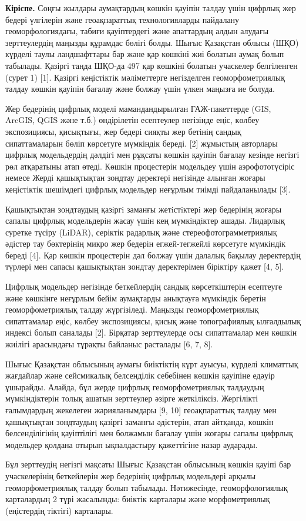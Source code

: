 \begin{multicols}{2}
{\bfseries Кіріспе.} Соңғы жылдары аумақтардың көшкін қауіпін талдау үшін
цифрлық жер бедері үлгілерін және геоақпараттық технологияларды
пайдалану геоморфологиядағы, табиғи қауіптердегі және апаттардың алдын
алудағы зерттеулердің маңызды құрамдас бөлігі болды. Шығыс Қазақстан
облысы (ШҚО) күрделі таулы ландшафттары бар және қар көшкіні жиі болатын
аумақ болып табылады. Қазіргі таңда ШҚО-да 497 қар көшкіні болатын
учаскелер белгіленген (сурет 1) {[}1{]}. Қазіргі кеңістіктік
мәліметтерге негізделген геоморфометриялық талдау көшкін қауіпін бағалау
және болжау үшін үлкен маңызға ие болуда.

Жер бедерінің цифрлық моделі мамандандырылған ГАЖ-пакеттерде (GIS,
ArcGIS, QGIS және т.б.) өндірілетін есептеулер негізінде еңіс, көлбеу
экспозициясы, қисықтығы, жер бедері сияқты жер бетінің сандық
сипаттамаларын бөліп көрсетуге мүмкіндік береді. {[}2{]} жұмыстың
авторлары цифрлық модельдердің дәлдігі мен рұқсаты көшкін қауіпін
бағалау кезінде негізгі рөл атқаратыны атап өтеді. Көшкін процестерін
модельдеу үшін аэрофототүсіріс немесе Жерді қашықтықтан зондтау
деректері негізінде алынған жоғары кеңістіктік шешімдегі цифрлық
модельдер неғұрлым тиімді пайдаланылады {[}3{]}.

Қашықтықтан зондтаудың қазiргi заманғы жетiстiктерi жер бедерінің жоғары
сапалы цифрлық модельдерiн жасау үшiн кең мүмкiндiктер ашады. Лидарлық
суретке түсіру (LiDAR), серіктік радарлық және стереофотограмметриялық
әдістер тау бөктерінің микро жер бедерін егжей-тегжейлі көрсетуге
мүмкіндік береді {[}4{]}. Қар көшкін процестерін дәл болжау үшін далалық
бақылау деректердің түрлері мен сапасы қашықтықтан зондтау деректерімен
біріктіру қажет {[}4, 5{]}.

Цифрлық модельдер негізінде беткейлердің сандық көрсеткіштерін есептеуге
және көшкінге неғұрлым бейім аумақтарды анықтауға мүмкіндік беретін
геоморфометриялық талдау жүргізіледі. Маңызды геоморфометриялық
сипаттамалар еңіс, көлбеу экспозициясы, қисық және топографиялық
ылғалдылық индексі болып саналады {[}2{]}. Бірқатар зерттеулерде осы
сипаттамалар мен көшкін жиілігі арасындағы тұрақты байланыс расталады
{[}6, 7, 8{]}.

Шығыс Қазақстан облысының аумағы биіктіктің күрт ауысуы, күрделі
климаттық жағдайлар және сейсмикалық белсенділік себебінен көшкін
қауіпіне едәуір ұшырайды. Алайда, бұл жерде цифрлық геоморфометриялық
талдаудың мүмкіндіктерін толық ашатын зерттеулер әзірге жеткіліксіз.
Жергілікті ғалымдардың жекелеген жарияланымдары {[}9, 10{]}
геоақпараттық талдау мен қашықтықтан зондтаудың қазіргі заманғы
әдістерін, атап айтқанда, көшкін белсенділігінің қауіптілігі мен
болжамын бағалау үшін жоғары сапалы цифрлық модельдер қолдана отырып
ықпалдастыру қажеттігіне назар аударады.

Бұл зерттеудің негізгі мақсаты Шығыс Қазақстан облысының көшкін қауіпі
бар учаскелерінің беткейлерін жер бедерінің цифрлық модельдері арқылы
геоморфометриялық талдау болып табылады. Нәтижесінде, геоморфологиялық
карталардың 2 түрі жасалынды: биіктік карталары және морфометриялық
(еңістердің тіктігі) карталары.
\end{multicols}

